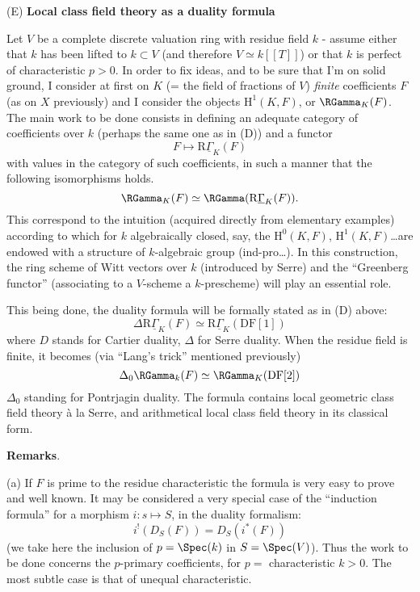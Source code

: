 \starsbreak

\label{sec:app13}%
(E) \textbf{Local class field theory as a duality formula}
    
    Let $V$ be a complete discrete valuation ring with residue field $k$ - assume either that $k$ has been lifted to $k \subset V$ (and therefore $V \simeq k[[T]]$) or that $k$ is perfect of characteristic $p > 0$. In order to fix ideas, and to be sure that I'm on solid ground, I consider at first on $K$ (= the field of fractions of $V$) \emph{finite} coefficients $F$ (as on $X$ previously) and I consider the objects $\mathrm{H}^1(K, F)$, or $\RGamma_K(F)$. The main work to be done consists in defining an adequate category of coefficients over $k$ (perhaps the same one as in (D)) and a functor
    $$
    F \mapsto \mathrm R \underline{\Gamma}_K(F)
    $$
    with values in the category of such coefficients, in such a manner that the following isomorphisms holds.
    $$
    \RGamma_K(F) \simeq \RGamma(\mathrm R \underline{\Gamma}_K(F)).
    $$
    This correspond to the intuition (acquired directly from elementary examples) according to which for $k$ algebraically closed, say, the $\mathrm{H}^0(K, F)$, $\mathrm{H}^1(K, F)$\dots are endowed with a structure of $k$-algebraic group (ind-pro\dots). In this construction, the ring scheme of Witt vectors over $k$ (introduced by Serre) and the ``Greenberg functor'' (associating to a $V$-scheme a $k$-prescheme) will play an essential role.
    
This being done, the duality formula will be formally stated as in (D) above: 
$$
\Delta \mathrm R \underline{\Gamma}_K(F) \simeq \mathrm R \underline{\Gamma}_K(\text{DF}[1])
$$
where $D$ stands for Cartier duality, $\Delta$ for Serre duality. When the residue field is finite, it becomes (via ``Lang's trick'' mentioned previously)
$$
\Delta_0 \RGamma_k(F) \simeq \RGamma_K(\text{DF}[2])
$$
$\Delta_0$ standing for Pontrjagin duality. The formula contains local geometric class field theory à la Serre, and arithmetical local class field theory in its classical form.

\textbf{Remarks}.

(a) If $F$ is prime to the residue characteristic the formula is very easy to prove and well known. It may be considered a very special case of the ``induction formula'' for a morphism $i: s \mapsto S$, in the duality formalism:
$$
i^!(D_S(F)) = D_S(i^*(F))
$$
(we take here the inclusion of $p = \Spec(k)$ in $S = \Spec(V)$). Thus the work to be done concerns the $p$-primary coefficients, for $p =$ characteristic $k > 0$. The most subtle case is that of unequal characteristic.

